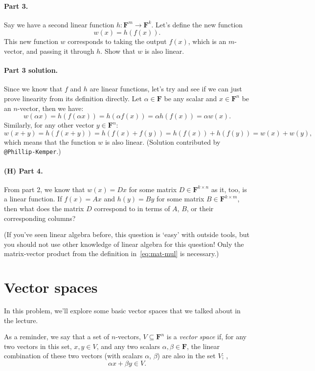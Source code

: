 \documentclass[12pt,hidelinks]{article}
\newcommand{\field}{\mathbf{F}}
\begin{document}
\paragraph{Part 3.} Say we have a second linear function $h: \field^m \to
\field^k$. Let's define the new function
\[
    w(x) = h(f(x)).
\]
This new function $w$ corresponds to taking the output $f(x)$, which is an
$m$-vector, and passing it through $h$. Show that $w$ is also linear.

\begin{solution}
\paragraph{Part 3 solution.} Since we know that $f$ and $h$ are linear
functions, let's try and see if we can just prove linearity from its definition
directly. Let $\alpha \in \field$ be any scalar and $x \in \field^n$ be an
$n$-vector, then we have:
\[
    w(\alpha x) = h(f(\alpha x)) = h(\alpha f(x)) = \alpha h(f(x)) = \alpha w(x).
\]
Similarly, for any other vector $y \in \field^n$:
\[
    w(x + y) = h(f(x + y)) = h(f(x) + f(y)) = h(f(x)) + h(f(y)) = w(x) + w(y),
\]
which means that the function $w$ is also linear. (Solution contributed by
\verb|@Phillip-Kemper|.)

\end{solution}

\paragraph{(H) Part 4.} From part 2, we know that $w(x) = Dx$ for some matrix
$D \in \field^{k \times n}$ as it, too, is a linear function. If $f(x) = Ax$
and $h(y) = By$ for some matrix $B \in \field^{k\times m}$, then what does the
matrix $D$ correspond to in terms of $A$, $B$, or their corresponding columns?

(If you've seen linear algebra before, this question is `easy' with outside
tools, but you should not use other knowledge of linear algebra for this
question! Only the matrix-vector product from the definition
in~\eqref{eq:mat-mul} is necessary.)

\section{Vector spaces}
In this problem, we'll explore some basic vector spaces that we talked about in the
lecture.

As a reminder, we say that a set of $n$-vectors, $V \subseteq \field^n$ is a
\emph{vector space} if, for any two vectors in this set, $x, y \in V$, and any
two scalars $\alpha, \beta \in \field$, the linear combination of these two
vectors (with scalars $\alpha$, $\beta$) are also in the set $V$; \ie,
\[
    \alpha x + \beta y \in V.
\]
\end{document}
